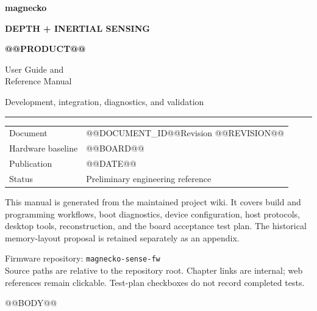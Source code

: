 \documentclass[10pt,a4paper,oneside]{report}
\makeatletter
\newcommand{\ProductName}{@@PRODUCT@@}
\newcommand{\BoardVersion}{@@BOARD@@}
\newcommand{\DocumentID}{@@DOCUMENT_ID@@}
\newcommand{\DocumentRevision}{@@REVISION@@}
\newcommand{\DocumentDate}{@@DATE@@}
\makeatother
\begin{document}
\raggedright
\hypersetup{pageanchor=false}
\begin{titlepage}
\thispagestyle{empty}
{\color{MGSRed}\Large\bfseries magnecko}\par
\vspace{22mm}
{\color{MGSRed}\small\bfseries DEPTH + INERTIAL SENSING}\par
\vspace{4mm}
{\fontsize{32}{38}\selectfont\bfseries\ProductName}\par
\vspace{6mm}
{\fontsize{22}{29}\selectfont User Guide and\\Reference Manual\par}
\vspace{10mm}
{\large Development, integration, diagnostics, and validation}\par
\vspace{9mm}
\textcolor{MGSRed}{\rule{\linewidth}{1.2pt}}\par
\vspace{8mm}
\begin{tabular}{@{}ll}
Document & \DocumentID\quad Revision \DocumentRevision \\
Hardware baseline & \BoardVersion \\
Publication & \DocumentDate \\
Status & Preliminary engineering reference
\end{tabular}
\vfill
{\small This manual is generated from the maintained project wiki. It covers
build and programming workflows, boot diagnostics, device configuration, host
protocols, desktop tools, reconstruction, and the board acceptance test plan.
The historical memory-layout proposal is retained separately as an appendix.\par}
\vspace{6mm}
{\small\color{MGSMuted}Firmware repository: \texttt{magnecko-sense-fw}\\
Source paths are relative to the repository root. Chapter links are internal;
web references remain clickable. Test-plan checkboxes do not record completed tests.\par}
\end{titlepage}
\hypersetup{pageanchor=true}
\tableofcontents
\clearpage
{}
@@BODY@@
\end{document}
